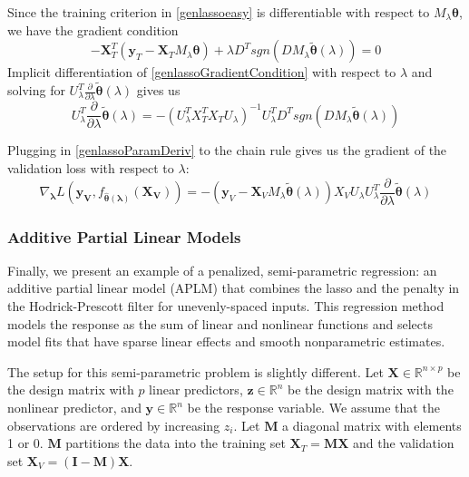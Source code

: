 \documentclass[10pt,letterpaper]{article}
\begin{document}
Since the training criterion in \eqref{genlassoeasy} is differentiable with respect to $M_\lambda \boldsymbol \theta$, we have the gradient condition
\begin{equation}
- \boldsymbol{X}_T^T (\boldsymbol{y}_T - \boldsymbol{X}_T M_\lambda \boldsymbol{\theta})
+ \lambda D^T sgn(DM_\lambda \tilde{\boldsymbol \theta}(\lambda)) = 0
\label{genlassoGradientCondition}
\end{equation}
Implicit differentiation of \eqref{genlassoGradientCondition} with respect to $\lambda$ and solving for $U_\lambda^T \frac{\partial}{\partial \lambda} \tilde{\boldsymbol \theta}(\lambda)$ gives us
\begin{equation}
U_\lambda^T \frac{\partial}{\partial \lambda} \tilde{\boldsymbol \theta}(\lambda) =
-(U_\lambda^T X_T^T X_T U_\lambda)^{-1} U_\lambda^T D^T sgn(DM_\lambda \tilde{\boldsymbol \theta}(\lambda))
\label{genlassoParamDeriv}
\end{equation}

Plugging in \eqref{genlassoParamDeriv} to the chain rule gives us the gradient of the validation loss with respect to $\lambda$:
\begin{equation}
\nabla_{\boldsymbol \lambda} L(\boldsymbol{y_V}, f_{\hat{\boldsymbol{\theta}}(\boldsymbol{\lambda})}(\boldsymbol{X_V})) = 
- \left (
\boldsymbol{y}_V - \boldsymbol{X}_V M_\lambda \tilde{\boldsymbol{\theta}} (\lambda)
\right )
X_V U_\lambda
U_\lambda^T \frac{\partial}{\partial \lambda} \tilde{\boldsymbol \theta}(\lambda)
\end{equation}


\subsubsection{Additive Partial Linear Models}

Finally, we present an example of a penalized, semi-parametric regression: an additive partial linear model (APLM) that combines the lasso and the penalty in the Hodrick-Prescott filter for unevenly-spaced inputs. This regression method models the response as the sum of linear and nonlinear functions and selects model fits that have sparse linear effects and smooth nonparametric estimates.

The setup for this semi-parametric problem is slightly different. Let $\boldsymbol{X} \in \mathbb{R}^{n \times p}$ be the design matrix with $p$ linear predictors, $\boldsymbol{z} \in \mathbb{R}^n$ be the design matrix with the nonlinear predictor, and $\boldsymbol{y} \in \mathbb{R}^n$ be the response variable. We assume that the observations are ordered by increasing $z_i$. Let $\boldsymbol{M}$ a diagonal matrix with elements 1 or 0. $\boldsymbol{M}$ partitions the data into the training set $\boldsymbol{X}_T= \boldsymbol{M} \boldsymbol{X}$ and the validation set $\boldsymbol{X}_V= (\boldsymbol{I} - \boldsymbol{M}) \boldsymbol{X}$.
\end{document}
